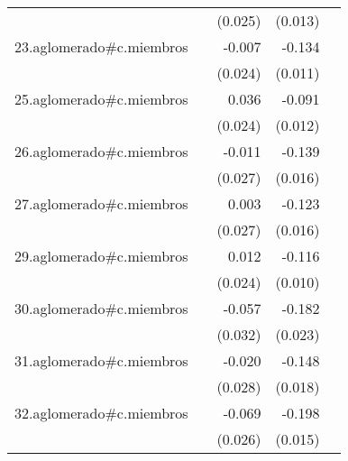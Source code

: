 {\begin{longtable}{l*{4}{D{.}{.}{-1}}}
            &                     &     (0.025)         &     (0.013)         &                     \\
\addlinespace
23.aglomerado#c.miembros&                     &      -0.007         &      -0.134\sym{***}&                     \\
            &                     &     (0.024)         &     (0.011)         &                     \\
\addlinespace
25.aglomerado#c.miembros&                     &       0.036         &      -0.091\sym{***}&                     \\
            &                     &     (0.024)         &     (0.012)         &                     \\
\addlinespace
26.aglomerado#c.miembros&                     &      -0.011         &      -0.139\sym{***}&                     \\
            &                     &     (0.027)         &     (0.016)         &                     \\
\addlinespace
27.aglomerado#c.miembros&                     &       0.003         &      -0.123\sym{***}&                     \\
            &                     &     (0.027)         &     (0.016)         &                     \\
\addlinespace
29.aglomerado#c.miembros&                     &       0.012         &      -0.116\sym{***}&                     \\
            &                     &     (0.024)         &     (0.010)         &                     \\
\addlinespace
30.aglomerado#c.miembros&                     &      -0.057         &      -0.182\sym{***}&                     \\
            &                     &     (0.032)         &     (0.023)         &                     \\
\addlinespace
31.aglomerado#c.miembros&                     &      -0.020         &      -0.148\sym{***}&                     \\
            &                     &     (0.028)         &     (0.018)         &                     \\
\addlinespace
32.aglomerado#c.miembros&                     &      -0.069\sym{**} &      -0.198\sym{***}&                     \\
            &                     &     (0.026)         &     (0.015)         &                     \\

\end{longtable}}
